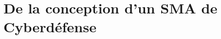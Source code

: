 \documentclass[ twoside,openright,titlepage,numbers=noenddot,headinclude,%
                footinclude=true,cleardoublepage=empty,abstractoff, %
                BCOR=5mm,paper=a4,fontsize=11pt,%
                french,american,%
                ]{scrreprt}
\begin{document}
\section{De la conception d'un SMA de Cyberdéfense}\label{sec:problematique-sma-aica}

\end{document}
